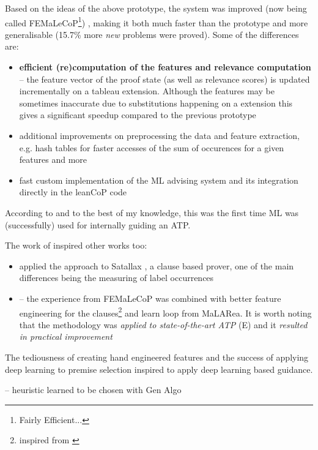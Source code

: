 \documentclass{article}
\begin{document}
Based on the ideas of the above prototype, the system was improved (now being
called FEMaLeCoP\footnote{Fairly Efficient...}) \citep{femalecop}, making it
both much faster than the prototype and more generalisable (15.7\% more
\emph{new} problems were proved). Some of the differences are:
\begin{itemize}
    \item \textbf{efficient (re)computation of the features and relevance
        computation} -- the feature vector of the proof state (as well as
        relevance scores) is updated incrementally on a tableau extension.
        Although the features may be sometimes inaccurate due to substitutions
        happening on a extension this gives a significant speedup compared to
        the previous prototype
    \item additional improvements on preprocessing the data and feature
        extraction, e.g. hash tables for faster accesses of the sum of
        occurences for a given features and more
    \item fast custom implementation of the ML advising system and its
        integration directly in the leanCoP code
\end{itemize}
According to \cite{femalecop} and to the best of my knowledge, this was
the first time ML was (successfully) used for internally guiding an ATP.

The work of \cite{femalecop} inspired other works too:
\begin{itemize}
    \item \cite{Satallax} applied the approach to Satallax
        \citep{SatallaxProver}, a clause based prover, one of the main
        differences being the measuring of label occurrences
    \item \cite{Enigma} -- the experience from FEMaLeCoP was combined with
        better feature engineering for the clauses\footnote{inspired from
        \cite{EFSF}} and learn loop from MaLARea. It is worth noting that
        the methodology was \emph{applied to state-of-the-art ATP} (E) and
        it \emph{resulted in practical improvement}
\end{itemize}

The tediousness of creating hand engineered features and the success of
applying deep learning to premise selection \citep{DeepMath} inspired
\cite{DNGPS} to apply deep learning based guidance.

\cite{FuchsGenetic} -- heuristic learned to be chosen with Gen Algo
\end{document}
